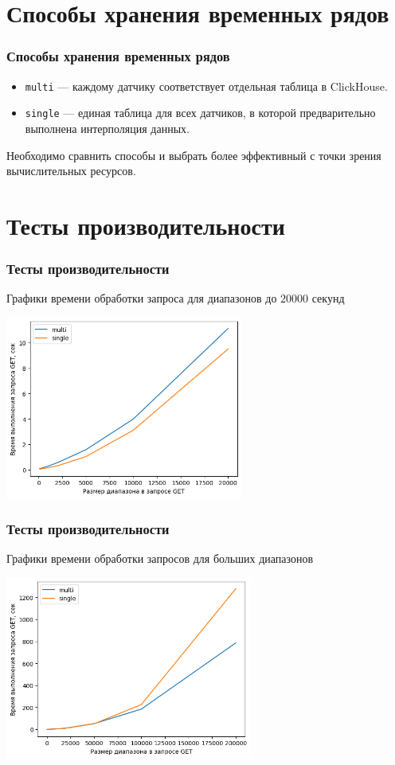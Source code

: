 \documentclass[pdf, hyperref={unicode}, aspectratio=169]{beamer}
\begin{document}
\section{Способы хранения временных рядов}
\begin{frame}
	\frametitle{Способы хранения временных рядов}
	
	\begin{itemize}
		\item \texttt{multi} --- каждому датчику соответствует отдельная таблица в ClickHouse.
		\item \texttt{single} --- единая таблица для всех датчиков, в которой предварительно выполнена интерполяция данных.
	\end{itemize}
	
	Необходимо сравнить способы и выбрать более эффективный с точки зрения вычислительных ресурсов.
\end{frame}


\section{Тесты производительности}
\begin{frame}
	\frametitle{Тесты производительности}
	
	Графики времени обработки запроса для диапазонов до $20000$ секунд
	
	\begin{center}
		\includegraphics[height = 6cm]{bench2e4.png}
	\end{center}
\end{frame}


\begin{frame}
	\frametitle{Тесты производительности}
	
	Графики времени обработки запросов для больших диапазонов
	
	\begin{center}
		\includegraphics[height = 6cm]{bench2e5.png}
	\end{center}
\end{frame}
\end{document}
